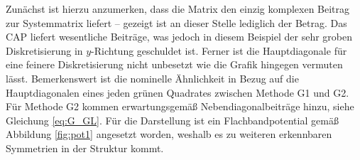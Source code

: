 Zunächst ist hierzu anzumerken, dass die Matrix den einzig komplexen Beitrag zur Systemmatrix liefert -- gezeigt ist an dieser Stelle lediglich der Betrag. Das CAP liefert wesentliche Beiträge, was jedoch in diesem Beispiel der sehr groben Diskretisierung in $y$-Richtung geschuldet ist. Ferner ist die Hauptdiagonale für eine feinere Diskretisierung nicht unbesetzt wie die Grafik hingegen vermuten lässt. Bemerkenswert ist die nominelle Ähnlichkeit in Bezug auf die Hauptdiagonalen eines jeden grünen Quadrates zwischen Methode G1 und G2. Für Methode G2 kommen erwartungsgemäß Nebendiagonalbeiträge hinzu, siehe Gleichung \eqref{eq:G_GL}. Für die Darstellung ist ein Flachbandpotential gemäß Abbildung \ref{fig:pot1} angesetzt worden, weshalb es zu weiteren erkennbaren Symmetrien in der Struktur kommt.



